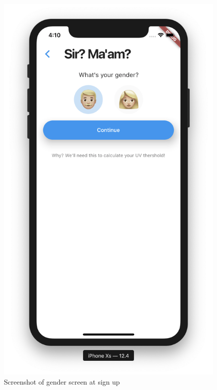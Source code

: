 \documentclass[12pt,openany,a4paper]{book}
\begin{document}
	\begin{figure}[h]
		\centering\includegraphics[width=\textwidth]{GenderScreen.png}
		\caption{Screenshot of gender screen at sign up}
		\label{fig:gender_screen}
		\end{figure}
\end{document}
